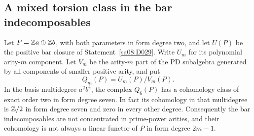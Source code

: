 \subsection{A mixed torsion class in the bar indecomposables}

\begin{proposition}
\label{sa08:D032}
Let $P=\mathbb Z a\oplus\mathbb Z b$, with both parameters in form degree two,
and let $U(P)$ be the positive bar closure of
Statement~\ref{sa08:D029}. Write $U_m$ for its polynomial arity-$m$
component. Let $V_m$ be the arity-$m$ part of the PD subalgebra
generated by all components of smaller positive arity, and put
\[
 Q_m(P)=U_m(P)/V_m(P).
\]
In the basis multidegree $a^2b^4$, the complex $Q_6(P)$ has a
cohomology class of exact order two in form degree seven.
In fact its cohomology in that multidegree is $\mathbb Z/2$ in form
degree seven and zero in every other degree.
Consequently the bar indecomposables are not concentrated in
prime-power arities, and their cohomology is not always a linear
functor of $P$ in form degree $2m-1$.
\end{proposition}
